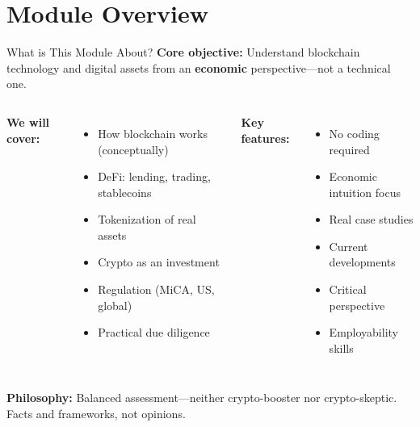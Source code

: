 \documentclass[10pt]{beamer}
\newcommand{\highlight}[1]{\textcolor{AccentOrange}{\textbf{#1}}}
\begin{document}
\section{Module Overview}

\begin{frame}{What is This Module About?}
  \textbf{Core objective:} Understand blockchain technology and digital assets from an \highlight{economic} perspective---not a technical one.
  
  \vspace{1em}
  \begin{columns}[T]
    \textbf{We will cover:}
    \begin{itemize}
      \item How blockchain works (conceptually)
      \item DeFi: lending, trading, stablecoins
      \item Tokenization of real assets
      \item Crypto as an investment
      \item Regulation (MiCA, US, global)
      \item Practical due diligence
    \end{itemize}
    
    \textbf{Key features:}
    \begin{itemize}
      \item No coding required
      \item Economic intuition focus
      \item Real case studies
      \item Current developments
      \item Critical perspective
      \item Employability skills
    \end{itemize}
  \end{columns}
  
  \vspace{1em}
  \textbf{Philosophy:} Balanced assessment---neither crypto-booster nor crypto-skeptic. Facts and frameworks, not opinions.
\end{frame}
\end{document}
